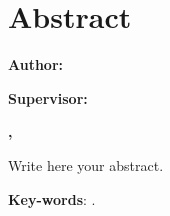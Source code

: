 \chapter*{Abstract}

\vspace{\onelineskip}

\noindent \textbf{\MakeUppercase\imprimirtituloen}

\vspace{5mm}

\noindent \textbf{Author: \imprimirautor}

\noindent \textbf{Supervisor: \imprimirorientador}

\noindent \textbf{\imprimircourse}

\noindent \textbf{\imprimirlocal, \imprimirano}

\vspace{5mm}
\noindent
Write here your abstract.

\vspace{5mm}
\noindent 
\textbf{Key-words}: .

